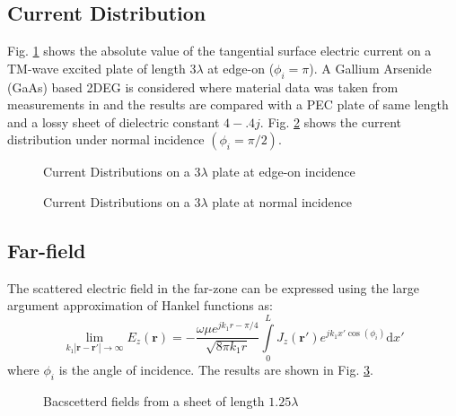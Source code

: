 \documentclass[conference, 10pt]{IEEEtran}
\renewcommand{\v}[1]{\mathbf{#1}} %
\renewcommand{\O}{\omega}  %
\renewcommand{\u}{\mu}  %
\renewcommand{\inf}{\infty}  %
\renewcommand{\^}{\hat}  %
\begin{document}
\subsection{Current Distribution}
%
Fig. \ref{fig:edgeon} shows the absolute value of the tangential surface electric current on a TM-wave excited plate of length $3 \lambda$ at edge-on ($\phi_i = \pi$). A Gallium Arsenide (GaAs) based 2DEG is considered where material data was taken from measurements in \cite{burke2000high} and the results are compared with a PEC plate of same length and a lossy sheet of dielectric constant $4 - .4j$. Fig. \ref{fig:normal} shows the current distribution under normal incidence $(\phi_i = \pi/2)$.
%
\begin{figure}[h]
  \normalsize
  \centering
  
  \caption{Current Distributions on a $3\lambda$ plate at edge-on incidence}
  \label{fig:edgeon}
\end{figure}
%
\begin{figure}[h]
  \normalsize
  \centering
  
  \caption{Current Distributions on a $3\lambda$ plate at normal incidence}
  \label{fig:normal}
\end{figure}
%
\subsection{Far-field}
%
The scattered electric field in the far-zone can be expressed using the large argument approximation of Hankel functions as:
%
\begin{equation}
  \lim_{k_1|\v r - \v r'|\to\inf} E_z(\v r) = -\frac{\O \u e^{j k_1 r - \pi/4}}{\sqrt{8 \pi k_1 r}}\int \limits_{0}^{L} J_z(\v r') e^{j k_1 x' \cos(\phi_i)} \mathrm{d}x'
  \label{eq:far-field}
\end{equation}
%
where $\phi_i$ is the angle of incidence. The results are shown in Fig. \ref{fig:rcs}.
%
\begin{figure}[h]
  \centering
  
  \caption{Bacscetterd fields from  a sheet of length $1.25\lambda$}
  \label{fig:rcs}
\end{figure}


\end{document}
